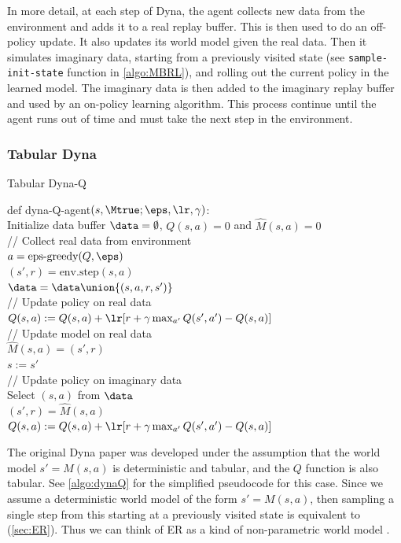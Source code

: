 In more detail,
at each step of Dyna, the agent collects new data
from the environment and adds it to a real replay buffer.
This is then used to do an off-policy update.
It also updates its world model given the real data.
Then it simulates  imaginary data,
starting from a previously visited state
(see {\tt sample-init-state} function
in \cref{algo:MBRL}),
and rolling  out the current policy in the learned model.
The imaginary data is then added to the imaginary replay buffer
and used by an on-policy learning algorithm.
This process continue until the agent runs
out of time and must take the next step in the environment.


\subsubsection{Tabular Dyna}

\begin{algorithm}
\dontprintsemicolon
\caption{Tabular Dyna-Q}
\label{algo:dynaQ}
def dyna-Q-agent$(s, \Mtrue; \eps, \lr, \gamma)$: \\
Initialize 
data buffer $\data=\emptyset$, $Q(s,a)=0$ and $\hat{M}(s,a)=0$ \\
       {
               // Collect real data from environment \\
         $a = \text{eps-greedy}(Q, \eps)$ \\
         $(s',r) = \text{env.step}(s,a)$ \\
               $\data = \data \union \{(s,a,r,s')\}$ \\
               // Update policy on real data \\
               $Q(s,a) := Q(s,a) + \lr[r + \gamma \max_{a'} Q(s',a') - Q(s,a)]$ \\
               // Update model on real data \\
         $\hat{M}(s,a) = (s', r)$ \\
         $s := s'$ \\
         // Update policy on imaginary data \\
             {
               Select $(s,a)$ from $\data$ \\
               $(s',r) =\hat{M}(s,a)$ \\
               $Q(s,a) := Q(s,a) + \lr[r + \gamma \max_{a'} Q(s',a') - Q(s,a)]$ 
               }
         }
\end{algorithm}


 The original Dyna paper was developed  under the assumption
 that the world model $s'=M(s,a)$ is deterministic and tabular,
 and the $Q$ function is also tabular.
 See \cref{algo:dynaQ} for the simplified pseudocode for this case.
Since  we assume a deterministic world model of the form
 $s'=M(s,a)$, then sampling a single step from this starting
 at a previously visited state is equivalent
 to  (\cref{sec:ER}).
 Thus  we can think of ER as a kind of non-parametric world model
 \citep{VanHasselt2019}.

